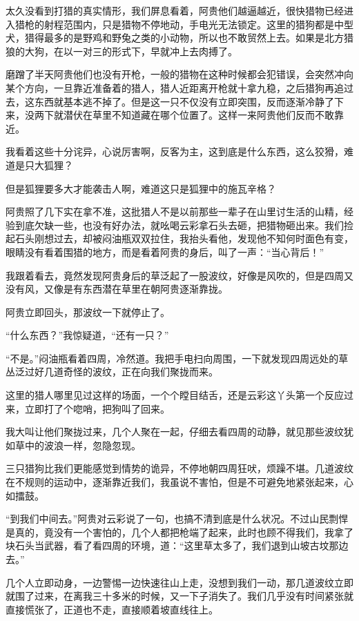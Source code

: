 太久没看到打猎的真实情形，我们屏息看着，阿贵他们越逼越近，很快猎物已经进入猎枪的射程范围内，只是猎物不停地动，手电光无法锁定。这里的猎狗都是中型犬，猎得最多的是野鸡和野兔之类的小动物，所以也不敢贸然上去。如果是北方猎狼的大狗，在以一对三的形式下，早就冲上去肉搏了。

磨蹭了半天阿贵他们也没有开枪，一般的猎物在这种时候都会犯错误，会突然冲向某个方向，一旦靠近准备着的猎人，猎人近距离开枪就十拿九稳，之后猎狗再追过去，这东西就基本逃不掉了。但是这一只不仅没有立即突围，反而逐渐冷静了下来，没两下就潜伏在草里不知道藏在哪个位置了。这样一来阿贵他们反而不敢靠近。

我看着这些十分诧异，心说厉害啊，反客为主，这到底是什么东西，这么狡猾，难道是只大狐狸？

但是狐狸要多大才能袭击人啊，难道这只是狐狸中的施瓦辛格？

阿贵照了几下实在拿不准，这批猎人不是以前那些一辈子在山里讨生活的山精，经验到底欠缺一些，也没有好办法，就吆喝云彩拿石头去砸，把猎物砸出来。我们捡起石头刚想过去，却被闷油瓶双双拉住，我抬头看他，发现他不知何时面色有变，眼睛没有看着围猎的地方，而是看着阿贵的身后，叫了一声：“当心背后！”

我跟着看去，竟然发现阿贵身后的草泛起了一股波纹，好像是风吹的，但是四周又没有风，又像是有东西潜在草里在朝阿贵逐渐靠拢。

阿贵立即回头，那波纹一下就停止了。

“什么东西？”我惊疑道，“还有一只？”

“不是。”闷油瓶看着四周，冷然道。我把手电扫向周围，一下就发现四周远处的草丛泛过好几道奇怪的波纹，正在向我们聚拢而来。

这里的猎人哪里见过这样的场面，一个个瞠目结舌，还是云彩这丫头第一个反应过来，立即打了个唿哨，把狗叫了回来。

我大叫让他们聚拢过来，几个人聚在一起，仔细去看四周的动静，就见那些波纹犹如草中的波浪一样，忽隐忽现。

三只猎狗比我们更能感觉到情势的诡异，不停地朝四周狂吠，烦躁不堪。几道波纹在不规则的运动中，逐渐靠近我们，我虽说不害怕，但是不可避免地紧张起来，心如擂鼓。

“到我们中间去。”阿贵对云彩说了一句，也搞不清到底是什么状况。不过山民剽悍是真的，竟没有一个害怕的，几个人都把枪端了起来，此时也顾不得我们，我拿了块石头当武器，看了看四周的环境，道：“这里草太多了，我们退到山坡古坟那边去。”

几个人立即动身，一边警惕一边快速往山上走，没想到我们一动，那几道波纹立即就围了过来，在离我三十多米的时候，又一下子消失了。我们几乎没有时间紧张就直接慌张了，正道也不走，直接顺着坡直线往上。

